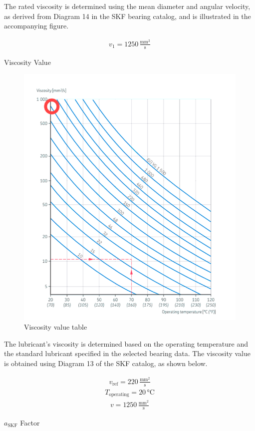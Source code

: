 \documentclass[12pt]{article}
\begin{document}
The rated viscosity is determined using the mean diameter and angular velocity, as derived from Diagram 14 in the SKF bearing catalog, and is illustrated in the accompanying figure. 

\begin{align}
v_1 = 1250 \, \frac{\text{mm}^2}{\text{s}}
\end{align}
\newpage

Viscosity Value
\begin{figure}[H]
    \centering
    \includegraphics[width=0.6\linewidth]{viscosityvalue.png}
    \caption{Viscosity value table}
    \label{fig:viscosityvalue}
\end{figure}

The lubricant's viscosity is determined based on the operating temperature and the standard lubricant specified in the selected bearing data. The viscosity value is obtained using Diagram 13 of the SKF catalog, as shown below.

\begin{align}
v_{\text{ref}} = 220 \, \frac{\text{mm}^2}{\text{s}}
\end{align}
\begin{align}
T_{\text{operating}} = 20 \, \text{°C}
\end{align}
\begin{align}
v = 1250 \, \frac{\text{mm}^2}{\text{s}}
\end{align}

\newpage

\( a_{\text{SKF}} \) Factor
\end{document}
